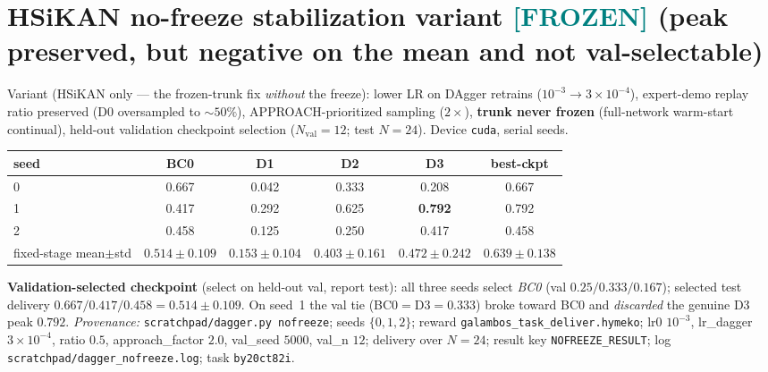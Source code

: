 \documentclass[11pt]{article}
\newcommand{\frozen}{\textcolor{teal}{\textbf{[FROZEN]}}}
\newcommand{\fn}[1]{\texttt{#1}}
\begin{document}
\section{HSiKAN no-freeze stabilization variant \frozen{} (peak preserved, but negative on the mean and not val-selectable)}
Variant (HSiKAN only --- the frozen-trunk fix \emph{without} the freeze): lower LR on DAgger retrains
($10^{-3}\to3\times10^{-4}$), expert-demo replay ratio preserved (D0 oversampled to $\sim50\%$),
APPROACH-prioritized sampling ($2\times$), \textbf{trunk never frozen} (full-network warm-start continual),
held-out validation checkpoint selection ($N_\text{val}=12$; test $N=24$). Device \fn{cuda}, serial seeds.

\begin{center}\begin{tabular}{lccccc}
\toprule
seed & BC0 & D1 & D2 & D3 & best-ckpt\\
\midrule
0 & 0.667 & 0.042 & 0.333 & 0.208 & 0.667\\
1 & 0.417 & 0.292 & 0.625 & \textbf{0.792} & 0.792\\
2 & 0.458 & 0.125 & 0.250 & 0.417 & 0.458\\
\midrule
fixed-stage mean$\pm$std & $0.514\pm0.109$ & $0.153\pm0.104$ & $0.403\pm0.161$ & $0.472\pm0.242$ & $\mathbf{0.639\pm0.138}$\\
\bottomrule
\end{tabular}\end{center}

\textbf{Validation-selected checkpoint} (select on held-out val, report test): all three seeds select \emph{BC0}
(val $0.25/0.333/0.167$); selected test delivery $0.667/0.417/0.458=0.514\pm0.109$. On seed~1 the val tie
(BC0$=$D3$=0.333$) broke toward BC0 and \emph{discarded} the genuine D3 peak $0.792$.
\emph{Provenance:} \fn{scratchpad/dagger.py nofreeze}; seeds $\{0,1,2\}$; reward \fn{galambos\_task\_deliver.hymeko};
lr0 $10^{-3}$, lr\_dagger $3\times10^{-4}$, ratio $0.5$, approach\_factor $2.0$, val\_seed $5000$, val\_n $12$;
delivery over $N=24$; result key \fn{NOFREEZE\_RESULT}; log \fn{scratchpad/dagger\_nofreeze.log}; task \fn{by20ct82i}.
\end{document}
